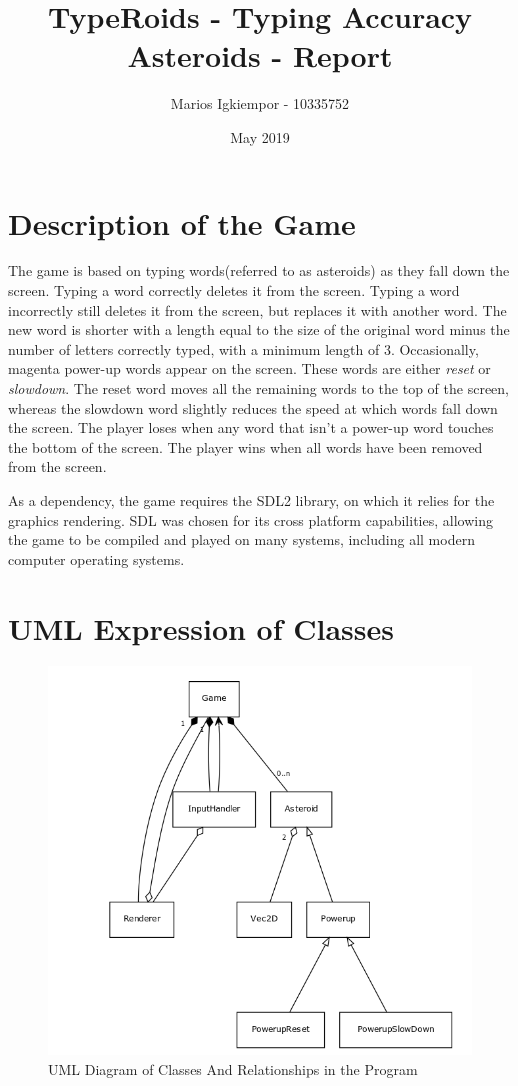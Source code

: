 \documentclass[a4paper,11pt]{article}
\title{TypeRoids - Typing Accuracy Asteroids - Report}
\author{Marios Igkiempor - 10335752}
\date{May 2019}
\begin{document}
\maketitle
 
\section{Description of the Game}
The game is based on typing words(referred to as asteroids) as they fall down the screen.
Typing a word correctly deletes it from the screen.
Typing a word incorrectly still deletes it from the screen, but replaces it with another word.
The new word is shorter with a length equal to the size of the original word minus the number of letters correctly typed, with a minimum length of 3.
Occasionally, magenta power-up words appear on the screen.
These words are either \textit{reset} or \textit{slowdown}.
The reset word moves all the remaining words to the top of the screen, whereas the slowdown word slightly reduces the speed at which words fall down the screen.
The player loses when any word that isn't a power-up word touches the bottom of the screen.
The player wins when all words have been removed from the screen.

As a dependency, the game requires the SDL2 library, on which it relies for the graphics rendering.
SDL was chosen for its cross platform capabilities, allowing the game to be compiled and played on many systems, including all modern computer operating systems.
 
\section{UML Expression of Classes}
\begin{figure}[H]
  \caption{UML Diagram of Classes And Relationships in the Program}
  \includegraphics[width=\linewidth]{./uml.png}
\end{figure}
\end{document}

